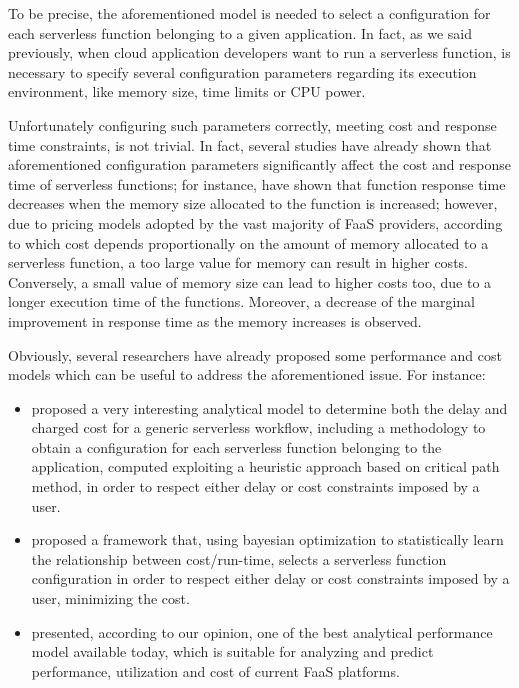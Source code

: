 \documentclass[12pt,a4paper]{report}
\begin{document}
To be precise, the aforementioned model is needed to select a configuration for each serverless function belonging to a given application. In fact, as we said previously, when cloud application developers want to run a serverless function, is necessary to specify several configuration parameters regarding its execution environment, like memory size, time limits or CPU power.

Unfortunately configuring such parameters correctly, meeting cost and response time constraints, is not trivial. In fact, several studies have already shown that aforementioned configuration parameters significantly affect the cost and response time of serverless functions; for instance, \citet{COSE} have shown that function response time decreases when the memory size allocated to the function is increased; however, due to pricing models adopted by the vast majority of FaaS providers, according to which cost depends proportionally on the amount of memory allocated to a serverless function, a too large value for memory can result in higher costs. Conversely, a small value of memory size can lead to higher costs too, due to a longer execution time of the functions. Moreover, a decrease of the marginal improvement in response time as the memory increases is observed.

Obviously, several researchers have already proposed some  performance and cost models which can be useful to address the aforementioned issue. For instance: 

\begin{itemize}
	\item \citet{PMSCP} proposed a very interesting analytical model to determine both the delay and charged cost for a generic serverless workflow, including a methodology to obtain a configuration for each serverless function belonging to the application, computed exploiting a heuristic approach based on critical path method, in order to respect either delay or cost constraints imposed by a user.
	
	\item \citet{COSE} proposed a framework that, using bayesian optimization to statistically learn the relationship between cost/run-time, selects a serverless function configuration in order to respect either delay or cost constraints imposed by a user, minimizing the cost.
	
	\item \citet{Modelling} presented, according to our opinion, one of the best analytical performance model available today, which is suitable for analyzing and predict performance, utilization and cost of current FaaS platforms. 
	
\end{itemize}
\end{document}
